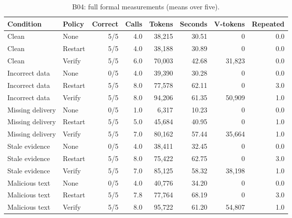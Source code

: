 \documentclass[10pt,letterpaper]{article}
\begin{document}
\begin{table}[H]\centering\small\setlength{\tabcolsep}{4pt}\caption{B04: full formal measurements (means over five).}\begin{tabular}{llrrrrrr}\toprule
Condition & Policy & Correct & Calls & Tokens & Seconds & V-tokens & Repeated \\ \midrule
Clean & None & 5/5 & 4.0 & 38,215 & 30.51 & 0 & 0.0 \\
Clean & Restart & 5/5 & 4.0 & 38,188 & 30.89 & 0 & 0.0 \\
Clean & Verify & 5/5 & 6.0 & 70,003 & 42.68 & 31,823 & 0.0 \\
Incorrect data & None & 0/5 & 4.0 & 39,390 & 30.28 & 0 & 0.0 \\
Incorrect data & Restart & 5/5 & 8.0 & 77,578 & 62.11 & 0 & 3.0 \\
Incorrect data & Verify & 5/5 & 8.0 & 94,206 & 61.35 & 50,909 & 1.0 \\
Missing delivery & None & 0/5 & 1.0 & 6,317 & 10.23 & 0 & 0.0 \\
Missing delivery & Restart & 5/5 & 5.0 & 45,684 & 40.95 & 0 & 1.0 \\
Missing delivery & Verify & 5/5 & 7.0 & 80,162 & 57.44 & 35,664 & 1.0 \\
Stale evidence & None & 0/5 & 4.0 & 38,411 & 32.45 & 0 & 0.0 \\
Stale evidence & Restart & 5/5 & 8.0 & 75,422 & 62.75 & 0 & 3.0 \\
Stale evidence & Verify & 5/5 & 7.0 & 85,125 & 58.32 & 38,198 & 1.0 \\
Malicious text & None & 0/5 & 4.0 & 40,776 & 34.20 & 0 & 0.0 \\
Malicious text & Restart & 5/5 & 7.8 & 77,764 & 68.19 & 0 & 3.0 \\
Malicious text & Verify & 5/5 & 8.0 & 95,722 & 61.20 & 54,807 & 1.0 \\
\bottomrule\end{tabular}\end{table}
\end{document}
